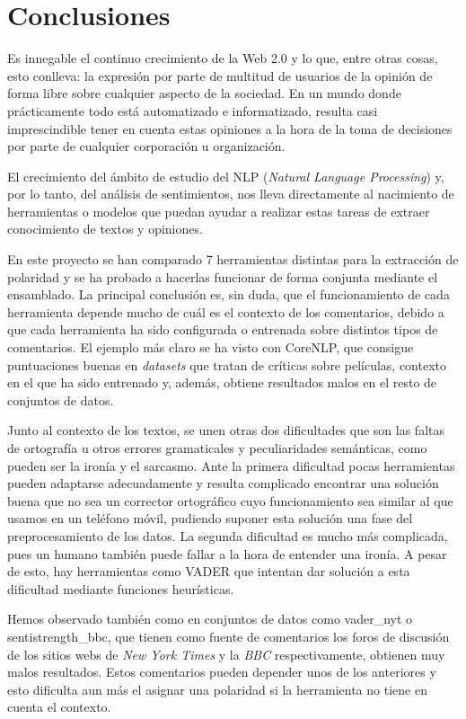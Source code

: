  \chapter{Conclusiones}
Es innegable el continuo crecimiento de la Web 2.0 y lo que, entre otras cosas, esto conlleva: la expresión por parte de multitud de usuarios de la opinión de forma libre sobre cualquier aspecto de la sociedad. En un mundo donde prácticamente todo está automatizado e informatizado, resulta casi imprescindible tener en cuenta estas opiniones a la hora de la toma de decisiones por parte de cualquier corporación u organización.

El crecimiento del ámbito de estudio del NLP (\textit{Natural Language Processing}) y, por lo tanto, del análisis de sentimientos, nos lleva directamente al nacimiento de herramientas o modelos que puedan ayudar a realizar estas tareas de extraer conocimiento de textos y opiniones.

En este proyecto se han comparado 7 herramientas distintas para la extracción de polaridad y se ha probado a hacerlas funcionar de forma conjunta mediante el ensamblado. La principal conclusión es, sin duda, que el funcionamiento de cada herramienta depende mucho de cuál es el contexto de los comentarios, debido a que cada herramienta ha sido configurada o entrenada sobre distintos tipos de comentarios. El ejemplo más claro se ha visto con CoreNLP, que consigue puntuaciones buenas en \textit{datasets} que tratan de críticas sobre películas, contexto en el que ha sido entrenado y, además, obtiene resultados malos en el resto de conjuntos de datos.

Junto al contexto de los textos, se unen otras dos dificultades que son las faltas de ortografía u otros errores gramaticales y peculiaridades semánticas, como pueden ser la ironía y el sarcasmo. Ante la primera dificultad pocas herramientas pueden adaptarse adecuadamente y resulta complicado encontrar una solución buena que no sea un corrector ortográfico cuyo funcionamiento sea similar al que usamos en un teléfono móvil, pudiendo suponer esta solución una fase del preprocesamiento de los datos. La segunda dificultad es mucho más complicada, pues un humano también puede fallar a la hora de entender una ironía. A pesar de esto, hay herramientas como VADER que intentan dar solución a esta dificultad mediante funciones heurísticas.

Hemos observado también como en conjuntos de datos como vader\_nyt o sentistrength\_bbc, que tienen como fuente de comentarios los foros de discusión de los sitios webs de \textit{New York Times} y la \textit{BBC} respectivamente, obtienen muy malos resultados. Estos comentarios pueden depender unos de los anteriores y esto dificulta aun más el asignar una polaridad si la herramienta no tiene en cuenta el contexto.

